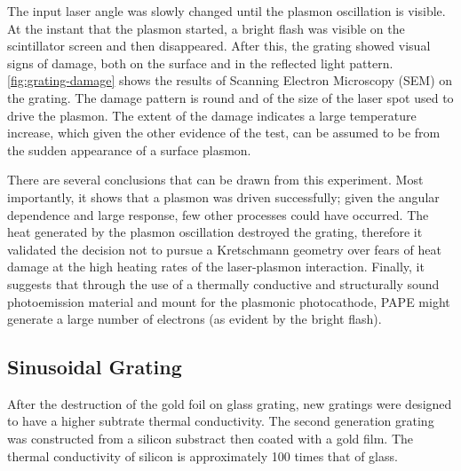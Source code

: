 The input laser angle was slowly changed until the plasmon oscillation is visible.
At the instant that the plasmon started, a bright flash was visible on the scintillator screen and then disappeared.
After this, the grating showed visual signs of damage, both on the surface and in the reflected light pattern.
\ref{fig:grating-damage} shows the results of Scanning Electron Microscopy (SEM) on the grating.
The damage pattern is round and of the size of the laser spot used to drive the plasmon.
The extent of the damage indicates a large temperature increase, which given the other evidence of the test, can be assumed to be from the sudden appearance of a surface plasmon.

There are several conclusions that can be drawn from this experiment.
Most importantly, it shows that a plasmon was driven successfully; given the angular dependence and large response, few other processes could have occurred.
The heat generated by the plasmon oscillation destroyed the grating, therefore it validated the decision not to pursue a Kretschmann geometry over fears of heat damage at the high heating rates of the laser-plasmon interaction.
Finally, it suggests that through the use of a thermally conductive and structurally sound photoemission material and mount for the plasmonic photocathode, PAPE might generate a large number of electrons (as evident by the bright flash).

\subsection{Sinusoidal Grating}

After the destruction of the gold foil on glass grating, new gratings were designed to have a higher subtrate thermal conductivity.
The second generation grating was constructed from a silicon substract then coated with a gold film.
The thermal conductivity of silicon is approximately 100 times that of glass. %

